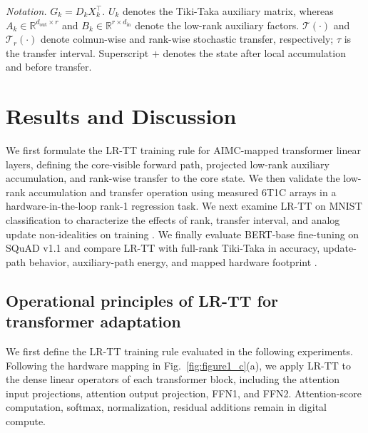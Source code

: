 \documentclass[AMA,LATO2COL]{WileyNJDv5}
\begin{document}
\begin{table}[!t]
{  \vspace{0.25em}
  \begin{minipage}{0.98\textwidth}
  \emph{Notation.}
  \(G_k=D_kX_k^\top\). \(U_k\) denotes the Tiki-Taka auxiliary matrix, whereas
\(A_k\in\mathbb{R}^{d_{\mathrm{out}}\times r}\) and
\(B_k\in\mathbb{R}^{r\times d_{\mathrm{in}}}\) denote the low-rank auxiliary factors.
\(\mathcal{T}(\cdot)\) and \(\mathcal{T}_r(\cdot)\) denote colmun-wise and rank-wise stochastic transfer, respectively; \(\tau\) is the transfer interval. Superscript \(+\) denotes the state after local accumulation and before transfer.
  \end{minipage}
  }
\end{table}

\section{Results and Discussion}
\label{sec:Results and Discussion}

\noindent
We first formulate the LR-TT training rule for AIMC-mapped transformer linear layers, defining the core-visible forward path, projected low-rank auxiliary accumulation, and rank-wise transfer to the core state.
We then validate the low-rank accumulation and transfer operation using measured 6T1C arrays in a hardware-in-the-loop rank-1 regression task.
We next examine LR-TT on MNIST classification to characterize the effects of rank, transfer interval, and analog update non-idealities on training \cite{lecun1998gradient}.
We finally evaluate BERT-base fine-tuning on SQuAD v1.1 and compare LR-TT with full-rank Tiki-Taka in accuracy, update-path behavior, auxiliary-path energy, and mapped hardware footprint \cite{devlin2019bert,rajpurkar2016squad}.

\subsection{Operational principles of LR-TT for transformer adaptation}
\label{subsec:results_lrtt_formulation}

\noindent
We first define the LR-TT training rule evaluated in the following experiments.
Following the hardware mapping in Fig.~\ref{fig:figure1_c}(a), we apply LR-TT to the dense linear operators of each transformer block, including the attention input projections, attention output projection, FFN1, and FFN2.
Attention-score computation, softmax, normalization, residual additions  remain in digital compute.
\end{document}
